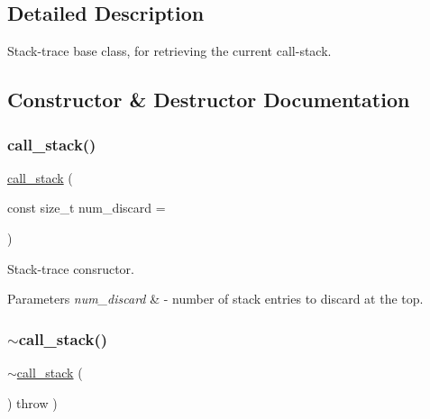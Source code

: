 \subsection{Detailed Description}
Stack-\/trace base class, for retrieving the current call-\/stack. 



\subsection{Constructor \& Destructor Documentation}
\mbox{\label{classstacktrace_1_1call__stack_a849ac898624b9ee9a0f6f385624243bb}} 
\subsubsection{\texorpdfstring{call\+\_\+stack()}{call\_stack()}}
{\footnotesize\ttfamily \mbox{\hyperlink{classstacktrace_1_1call__stack}{call\+\_\+stack}} (\begin{DoxyParamCaption}\item[{const size\+\_\+t}]{num\+\_\+discard = {} }\end{DoxyParamCaption})}



Stack-\/trace consructor. 


\begin{DoxyParams}{Parameters}
{\em num\+\_\+discard} & -\/ number of stack entries to discard at the top. \\
\hline
\end{DoxyParams}
\mbox{\label{classstacktrace_1_1call__stack_ad3a052567d850f543c14edadad05a833}} 
\subsubsection{\texorpdfstring{$\sim$call\+\_\+stack()}{~call\_stack()}}
{\footnotesize\ttfamily $\sim$\mbox{\hyperlink{classstacktrace_1_1call__stack}{call\+\_\+stack}} (\begin{DoxyParamCaption}{ }\end{DoxyParamCaption}) throw  ) \hspace{0.3cm}{\ttfamily [virtual]}}



